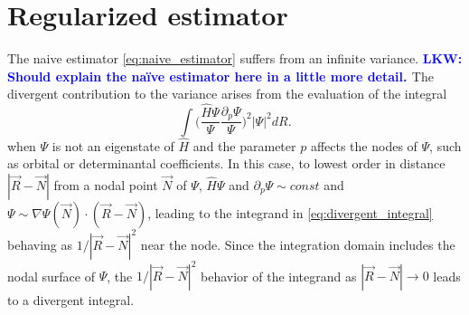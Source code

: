 \documentclass[twocolumn]{revtex4-1}
\newcommand{\lucas}[1]{\textbf{\textcolor{blue}{LKW: #1}}}
\begin{document}
\section{Regularized estimator}
The naive estimator \eqref{eq:naive_estimator} suffers from an infinite variance. 
\lucas{Should explain the na\"ive estimator here in a little more detail. } 
The divergent contribution to the variance arises from the evaluation of the integral
\begin{equation}
\int \Big(\frac{\hat{H}\Psi}{\Psi}\frac{\partial_p\Psi}{\Psi}\Big)^2 |\Psi|^2 dR.
\label{eq:divergent_integral}
\end{equation}
when $\Psi$ is not an eigenstate of $\hat{H}$ and the parameter $p$ affects the nodes of $\Psi$, such as orbital or determinantal coefficients.
In this case, to lowest order in distance $|\vec{R}-\vec{N}|$ from a nodal point $\vec{N}$ of $\Psi$, $\hat{H}\Psi$ and $\partial_p \Psi \sim const$ and $\Psi \sim \nabla \Psi(\vec{N}) \cdot (\vec{R} - \vec{N})$, leading to the integrand in \eqref{eq:divergent_integral} behaving as $1/|\vec{R}-\vec{N}|^2$ near the node.
Since the integration domain includes the nodal surface of $\Psi$, the $1/|\vec{R}-\vec{N}|^2$ behavior of the integrand as $|\vec{R}-\vec{N}|\rightarrow 0$ leads to a divergent integral.
\end{document}
